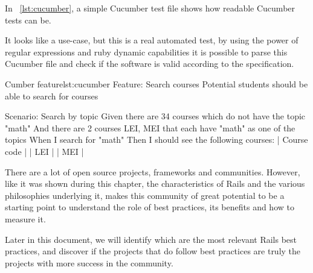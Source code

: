 In ~\ref{lst:cucumber}, a simple Cucumber test file shows how readable Cucumber tests can be.

It looks like a use-case, but this is a real automated test, 
by using the power of regular expressions and ruby dynamic capabilities
it is possible to parse this Cucumber file and check if the software is valid according to the specification. 

\begin{rubycode}{Cumber feature}{lst:cucumber}
Feature: Search courses
  Potential students should be able to search for courses

  Scenario: Search by topic
    Given there are 34 courses which do not have the topic "math"
    And there are 2 courses LEI, MEI that each have "math" as one of the topics
    When I search for "math"
    Then I should see the following courses:
      | Course code |
      | LEI         |
      | MEI         |
\end{rubycode}

There are a lot of open source projects, frameworks and communities. 
However, like it was shown during this chapter, the characteristics of Rails and the various philosophies underlying it,
makes this community of great potential to be a starting point to understand the role of best practices, 
its benefits and how to measure it. 

Later in this document, we will identify which are the most relevant Rails best practices,
and discover if the projects that do follow best practices are truly the projects with more success in the community.


